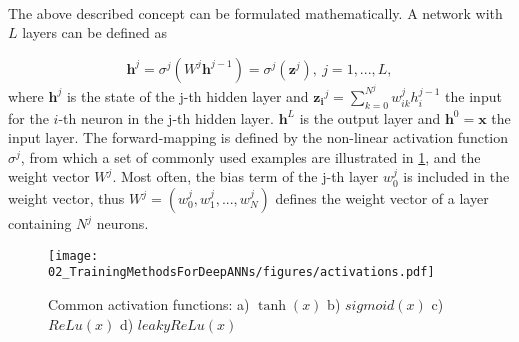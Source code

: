 \documentclass[main]{subfiles}
\begin{document}
	\paragraph{}
	\noindent
	The above described concept can be formulated mathematically. A network with $L$ layers can be defined as 
	
	\begin{equation}
	\bm{h}^j = \sigma^j(W^j\bm{h}^{j-1}) = \sigma^j(\bm{z}^j),\ j=1, ..., L ,
	\end{equation}
	where $\bm{h}^{j}$ is the state of the j-th hidden layer and $\bm{z_i}^j = \sum_{k=0}^{N^j} w_{ik}^j h_i^{j-1}$ the input for the $i$-th neuron in the j-th hidden layer.  $\bm{h}^L$ is the output layer and $\bm{h}^0=\bm{x}$ the input layer. The forward-mapping is defined by the non-linear activation function $\sigma^j$, from which a set of commonly used examples are illustrated in \cref{fig:activation}, and the weight vector $W^j$. Most often, the bias term of the j-th layer $w_{0}^{j}$ is included in the weight vector, thus $W^j = (w_{0}^{j}, w_{1}^{j}, ..., w_{N}^{j})$ defines the weight vector of a layer containing $N^j$ neurons. 
	\begin{figure}[t]
		\centering
		\texttt{[image: 02\_TrainingMethodsForDeepANNs/figures/activations.pdf]}
		\caption{Common activation functions: a) $\tanh(x)$ b) $sigmoid(x)$ c) $ReLu(x)$ d) $leakyReLu(x)$}
		\label{fig:activation}
	\end{figure}
	
\end{document}
